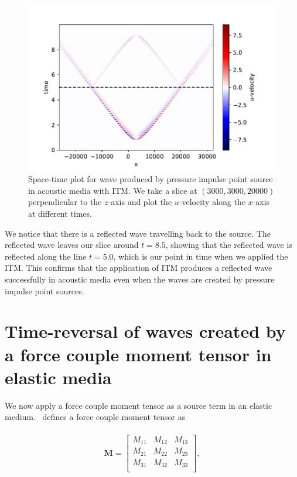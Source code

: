 \begin{figure}[htpb]
    \centering
    \includegraphics[width=0.75\linewidth]{figures/pressure-impulse-ITM.pdf}
    \caption{Space-time plot for wave produced by pressure impulse point source in acoustic media with \ac{ITM}. We take a slice at $\left(3000,3000,20000\right)$perpendicular to the $z$-axis and plot the
    $u$-velocity along the $x$-axis at different times.}
    \label{fig:space-timeplot-pressureITM}
\end{figure}

We notice that there is a reflected wave travelling back to the source. The reflected wave leaves our slice around $t=8.5$, showing that the reflected wave is reflected
along the line $t=5.0$, which is our point in time when we applied the \ac{ITM}. This confirms that the application of \ac{ITM} produces a reflected wave successfully in acoustic media even
when the waves are created by pressure impulse point sources.

\section{Time-reversal of waves created by a force couple moment tensor in elastic media}\label{sec:doublecouple}
We now apply a force couple moment tensor as a source term in an elastic medium.~\parencite[Sec. 9.2]{shearer_2019} defines a force couple moment tensor as

\begin{align}
    \begin{split}
        \mathbf{M} =
            \begin{bmatrix}
                M_{11} & M_{12} & M_{13} \\
                M_{21} & M_{22} & M_{23} \\
                M_{31} & M_{32} & M_{33} \\
            \end{bmatrix} ,
    \end{split}
\end{align}

